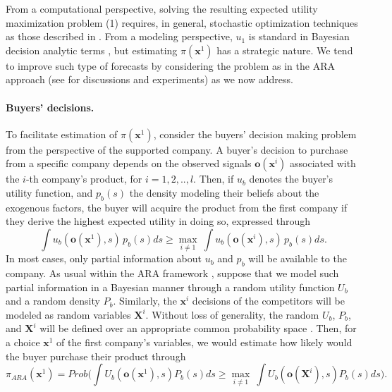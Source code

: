 \documentclass[a4paper,fleqn, 11pt]{cas-sc}
\begin{document}
  
  \noindent   From a computational perspective,  solving the resulting expected utility maximization problem 
    (1) requires, in general, stochastic optimization techniques as those described in \cite{POWELL}.
  From a modeling perspective, $u_1$ is standard in Bayesian decision analytic terms \citep{french},
but estimating $\pi({\bm x}^1)$ has a strategic nature. %
   We tend to improve 
 such type of forecasts by considering the problem 
 as in the ARA approach (see \cite{gomez2025forecasting, banks2022} for discussions and experiments) as we now address.

\paragraph{{\bf Buyers' decisions.}}  To facilitate estimation of $\pi({\bm x}^1)$, consider the  buyers' decision making problem 
  from the perspective of the supported company. A buyer's decision to purchase from a specific company depends on the observed signals ${\bm o}({\bm x}^i)$ associated with the $i$-th company's product, for $i = 1, 2, .., l$.  Then, if $u_b$ denotes the buyer's utility function, and $p_b(s)$  the density modeling their beliefs about the exogenous factors, the buyer will acquire the product from the first company if they derive the highest expected utility in doing so, expressed through 
\begin{equation}\label{kkoviedo}
    \int u_b({\bm o} ({\bm x}^1), s)\,p_b(s)ds \geq \max_{i \neq 1} ~\int  u_b({\bm o} ({\bm x}^i), s)\,p_b(s)ds .
\end{equation}
 In most cases, only partial information about  $u_b$ and $p_b$ will 
  be available
 to the company. As usual within the ARA framework \citep{banks2015adversarial}, suppose that we model such  partial
 information in a Bayesian manner through a random utility function $U_b$ and a random density $P_b$. Similarly, the ${\bm x}^i$ decisions 
 of the competitors will be modeled as 
random variables ${\bm X}^i$. Without loss of generality, the
random $U_b$, $P_b$, and ${\bm X}^i$ will be defined over 
an appropriate common probability space \citep{Chung}. 
 Then, for a choice ${\bm x}^1$ of the first 
 company's variables, 
we would estimate
  how likely would the buyer purchase their product through   
\begin{equation}
  \pi_{ARA}({\bm x}^1)= Prob \Big(\int U_b({\bm o} ({\bm x}^1), s)P_b(s)ds \geq \max_{i \neq 1} ~\int  U_b({\bm o} ({\bm X}^i), s)P_b(s)ds\Big) .
   \label{eq:pi}
\end{equation}
\end{document}
